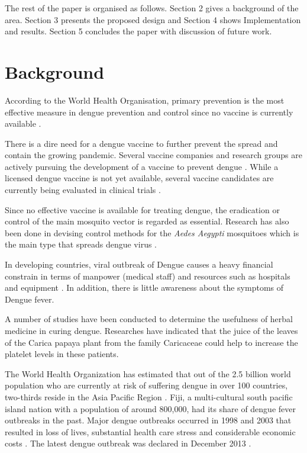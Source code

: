 \documentclass[runningheads,a4paper]{llncs}
\begin{document}
The rest of the paper is organised as follows. Section 2 gives a background of the area. Section 3 presents the proposed design and Section 4 shows Implementation and results. Section 5 concludes the paper with discussion of future work. 

\section{Background}
According to the World Health Organisation, primary prevention is the most effective measure in dengue prevention and control since no vaccine is currently available \cite{WHO2009}.

There is a dire need for a dengue vaccine to further prevent the spread   and contain the growing pandemic. Several vaccine companies and research groups are actively pursuing the development of a vaccine to prevent dengue \cite{Cassetti20143115}. While a licensed dengue vaccine is not yet available, several vaccine candidates are currently being evaluated in clinical trials \cite{Schmitz20117276}.

Since no effective vaccine is available for treating dengue, the eradication or control of the main mosquito vector is regarded as essential. Research has also been done in devising control methods for the \textit{Aedes Aegypti} mosquitoes which is the main type that spreads dengue virus \cite{Morrison2008}. 

In developing   countries, viral outbreak of Dengue causes a heavy financial constrain in terms of manpower (medical staff) and resources such as hospitals and equipment \cite{Humayoun2010e54}. In addition,  there is little awareness  about the symptoms of Dengue fever.

A number of studies have been conducted to determine the usefulness of herbal medicine in curing dengue. Researches have indicated that the juice of the leaves of the Carica papaya plant from the family Caricaceae could help to increase the platelet levels in these patients. \cite{Subenthiran2013} \cite{Senthilvel2013} \cite{Sarala2014}

The World Health Organization has estimated that out of the 2.5 billion world population who are currently at risk of suffering dengue in over 100 countries, two-thirds reside in the Asia Pacific Region \cite{WHO2009}.
Fiji, a multi-cultural south pacific island nation with a population of around 800,000, had its share of dengue fever outbreaks in the past. Major dengue outbreaks occurred in 1998 and 2003 that resulted in loss of lives, substantial health care stress and considerable economic costs \cite{Tabua2013}. The latest dengue outbreak was declared in December 2013 \cite{Vuibau2013}.
\end{document}
